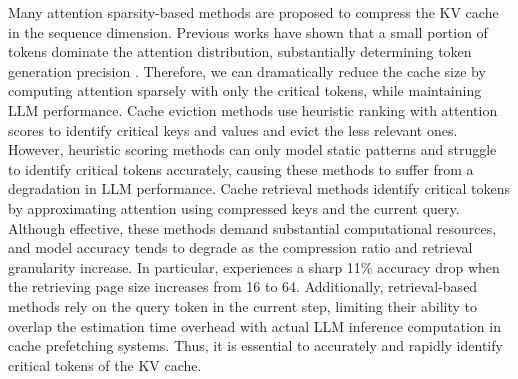 Many attention sparsity-based methods are proposed to compress the KV cache in the sequence dimension. 
Previous works have shown that a small portion of tokens dominate the attention distribution,  substantially determining token generation precision \citep{liu2023dejavu,zhang2023h2o, ge2024fastgen}.
Therefore, we can dramatically reduce the cache size by computing attention sparsely with only the critical tokens, while maintaining LLM performance. 
Cache eviction methods \citep{zhang2023h2o, xiao2024streamingllm,li2024snapkv} use heuristic ranking with attention scores to identify critical keys and values and evict the less relevant ones. However, heuristic scoring methods can only model static patterns and struggle to identify critical tokens accurately, causing these methods to suffer from a degradation in LLM performance.
Cache retrieval methods \citep{tang2024quest, zhang2024pqcache} identify critical tokens by approximating attention using compressed keys and the current query.
Although effective,
these methods demand substantial computational resources, and model accuracy tends to degrade as the compression ratio and retrieval granularity increase. 
In particular, \citet{tang2024quest} experiences a sharp 11\% accuracy drop when the retrieving page size increases from 16 to 64.
Additionally, retrieval-based methods rely on the query token in the current step, limiting their ability to overlap the estimation time overhead with actual LLM inference computation in cache prefetching systems. 
Thus, it is essential to accurately and rapidly identify critical tokens of the KV cache.



